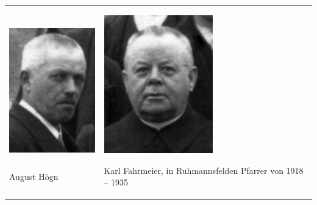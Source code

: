 \begin{center}
\begin{minipage}{9.638cm}
\begin{center}
\tablefirsthead{}
\tablehead{}
\tabletail{}
\tablelasttail{}
\begin{supertabular}{m{4.333cm}m{4.905cm}}

\includegraphics[width=4.15cm,height=6.006cm]{pictures/August-Hoegn_Nachruf.jpg}

August Högn &

\includegraphics[width=4.722cm,height=5.994cm]{pictures/zulassungsarbeit-img029.jpg}

Karl Fahrmeier, in Ruhmannsfelden
Pfarrer von 1918 – 1935\\
\end{supertabular}
\end{center}
\end{minipage}
\end{center}
